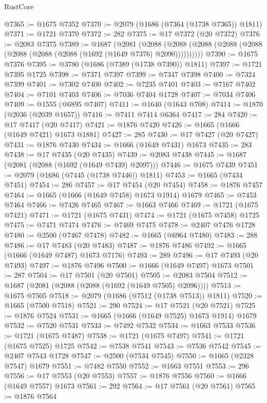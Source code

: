 \begin{lexlean}{RustCore}
\begin{coremodule}
@7365 := @1675 @7352
@7370 := @2079 (@1686 (@7364 (@1738 @7365)) @1811)
@7371 := @1721 @7370
@7372 := 282
@7375 := @17 @7372 (@20 @7372)
@7376 := @2083 @7375
@7389 := @1687
    (@2081
      (@2088 (@2088 (@2088 (@2088 (@2088 (@2088 (@2088 (@2088 (@1692 (@1649 @7376) @2090))))))))))
@7390 := @1675 @7376
@7395 := @3780 (@1686 (@7389 (@1738 @7390)) @1811)
@7397 := @1721 @7395 @1725
@7398 := @7371 @7397
@7399 := @7347 @7398
@7400 := @7324 @7399
@7401 := @7302 @7400
@7402 := @7235 @7401
@7403 := @7167 @7402
@7404 := @7101 @7403
@7406 := @7036 @7404 @1728
@7407 := @7034 @7406
@7409 := @1555 (@6895 @7407)
@7411 := @1640 (@1643 @708)
@7414 := @1870 (@2036 (@2039 @1657))
@7416 := @7411 @7414 @6364
@7417 := 284
@7420 := @17 @7417 (@20 @7417)
@7421 := @1876 @7420
@7426 := @1665 (@1666 (@1649 @7421) @1673 @1881)
@7427 := 285
@7430 := @17 @7427 (@20 @7427)
@7431 := @1876 @7430
@7434 := @1666 (@1649 @7431) @1673
@7435 := 283
@7438 := @17 @7435 (@20 @7435)
@7439 := @2083 @7438
@7445 := @1687 (@2081 (@2088 (@1692 (@1649 @7439) @2097)))
@7446 := @1675 @7439
@7451 := @2079 (@1686 (@7445 (@1738 @7446)) @1811)
@7453 := @1665 (@7434 @7451)
@7454 := 286
@7457 := @17 @7454 (@20 @7454)
@7458 := @1876 @7457
@7464 := @1665 (@1666 (@1649 @7458) @1673 @1914) @1679
@7465 := @7453 @7464
@7466 := @7426 @7465
@7467 := @1663 @7466
@7469 := @1721 (@1675 @7421)
@7471 := @1721 (@1675 @7431)
@7474 := @1721 (@1675 @7458) @1725
@7475 := @7471 @7474
@7476 := @7469 @7475
@7478 := @2407 @7476 @1728
@7480 := @2500 (@7467 @7478)
@7482 := @1665 (@6964 @7480)
@7483 := 288
@7486 := @17 @7483 (@20 @7483)
@7487 := @1876 @7486
@7492 := @1665 (@1666 (@1649 @7487) @1673 @7176)
@7493 := 289
@7496 := @17 @7493 (@20 @7493)
@7497 := @1876 @7496
@7500 := @1666 (@1649 @7497) @1673
@7501 := 287
@7504 := @17 @7501 (@20 @7501)
@7505 := @2083 @7504
@7512 := @1687 (@2081 (@2088 (@2088 (@1692 (@1649 @7505) @2096))))
@7513 := @1675 @7505
@7518 := @2079 (@1686 (@7512 (@1738 @7513)) @1811)
@7520 := @1665 (@7500 @7518)
@7521 := 290
@7524 := @17 @7521 (@20 @7521)
@7525 := @1876 @7524
@7531 := @1665 (@1666 (@1649 @7525) @1673 @1914) @1679
@7532 := @7520 @7531
@7533 := @7492 @7532
@7534 := @1663 @7533
@7536 := @1721 (@1675 @7487)
@7538 := @1721 (@1675 @7497)
@7541 := @1721 (@1675 @7525) @1725
@7542 := @7538 @7541
@7543 := @7536 @7542
@7545 := @2407 @7543 @1728
@7547 := @2500 (@7534 @7545)
@7550 := @1665 (@2328 @7547) @1679
@7551 := @7482 @7550
@7552 := @1663 @7551
@7553 := 296
@7556 := @17 @7553 (@20 @7553)
@7557 := @1876 @7556
@7560 := @1666 (@1649 @7557) @1673
@7561 := 292
@7564 := @17 @7561 (@20 @7561)
@7565 := @1876 @7564

\end{coremodule}
\end{lexlean}
